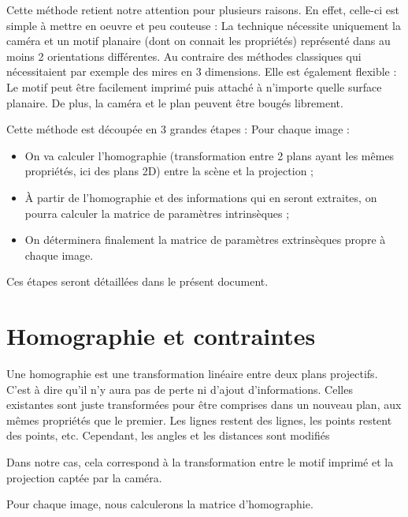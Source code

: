 \documentclass[a4paper]{article}
\begin{document}
Cette méthode retient notre attention pour plusieurs raisons. En effet, celle-ci est simple à mettre en oeuvre et peu couteuse :
La technique nécessite uniquement la caméra et un motif planaire (dont on connait les propriétés) représenté dans au moins 2 orientations différentes. Au contraire des méthodes classiques qui nécessitaient par exemple des mires en 3 dimensions.
Elle est également flexible :
Le motif peut être facilement imprimé puis attaché à n'importe quelle surface planaire. De plus, la caméra et le plan peuvent être bougés librement.

Cette méthode est découpée en 3 grandes étapes :
Pour chaque image :
\begin{itemize}
  \item On va calculer l'homographie (transformation entre 2 plans ayant les mêmes propriétés, ici des plans 2D) entre la scène et la projection ;
  \item À partir de l'homographie et des informations qui en seront extraites, on pourra calculer la matrice de paramètres intrinsèques ;
  \item On déterminera finalement la matrice de paramètres extrinsèques propre à chaque image.
\end{itemize}

Ces étapes seront détaillées dans le présent document.

\clearpage

\section{Homographie et contraintes}

Une homographie est une transformation linéaire entre deux plans projectifs. C'est à dire qu'il n'y aura pas de perte ni d'ajout d'informations. Celles existantes sont juste transformées pour être comprises dans un nouveau plan, aux mêmes propriétés que le premier. Les lignes restent des lignes, les points restent des points, etc. Cependant, les angles et les distances sont modifiés

Dans notre cas, cela correspond à la transformation entre le motif imprimé et la projection captée par la caméra.

Pour chaque image, nous calculerons la matrice d'homographie.
\end{document}
